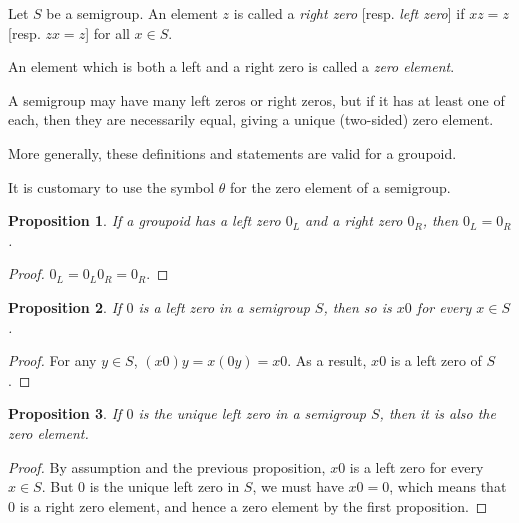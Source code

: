 \documentclass[12pt]{article}
\newtheorem{prop}{Proposition}
\begin{document}
Let $S$ be a semigroup.  An element $z$ is called a \emph{right zero} [resp. \emph{left zero}] if $xz = z$ [resp. $zx = z$] for all $x \in S$.  

An element which is both a left and a right zero is called a \emph{zero element}.

A semigroup may have many left zeros or right zeros, but if it has at least one of each, then they are necessarily equal, giving a unique (two-sided) zero element.

More generally, these definitions and statements are valid for a groupoid.

It is customary to use the symbol $\theta$ for the zero element of a semigroup.

\begin{prop} If a groupoid has a left zero $0_L$ and a right zero $0_R$, then $0_L = 0_R$. \end{prop}
\begin{proof} $0_L=0_L 0_R = 0_R$. \end{proof}

\begin{prop} If $0$ is a left zero in a semigroup $S$, then so is $x0$ for every $x\in S$.  \end{prop}
\begin{proof}
For any $y\in S$, $(x0)y=x(0y)=x0$.  As a result, $x0$ is a left zero of $S$.
\end{proof}

\begin{prop} If $0$ is the unique left zero in a semigroup $S$, then it is also the zero element.  \end{prop}
\begin{proof}
By assumption and the previous proposition, $x0$ is a left zero for every $x\in S$.  But $0$ is the unique left zero in $S$, we must have $x0=0$, which means that $0$ is a right zero element, and hence a zero element by the first proposition.
\end{proof}
\end{document}
